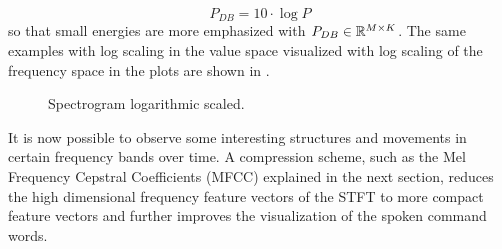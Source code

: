 \begin{equation}\label{eq:signal_spec_log}
  P_{DB} = 10 \cdot \log{P}
\end{equation}
so that small energies are more emphasized with $P_{DB} \in \mathbb{R}^{M \times K}$. 
The same examples with log scaling in the value space visualized with log scaling of the frequency space in the plots are shown in .
\begin{figure}[!ht]
  \centering
  \caption{Spectrogram logarithmic scaled.}
  \label{fig:signal_spec_log_showcase}
\end{figure}
\FloatBarrier
\noindent
It is now possible to observe some interesting structures and movements in certain frequency bands over time.
A compression scheme, such as the Mel Frequency Cepstral Coefficients (MFCC) explained in the next section, reduces the high dimensional frequency feature vectors of the STFT to more compact feature vectors and further improves the visualization of the spoken command words.